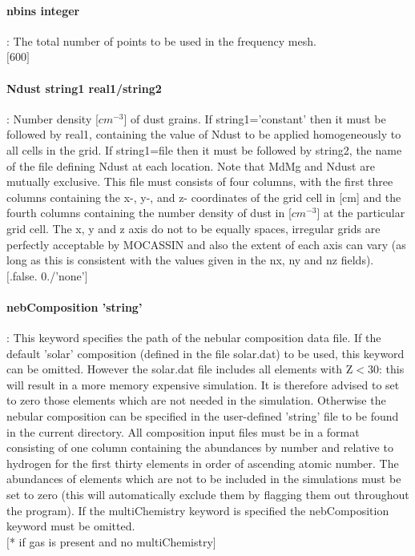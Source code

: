 \documentclass[11pt]{article}
\begin{document}
\paragraph    {nbins integer  }  : The total number of points to be used in the frequency mesh. \\
		     $[$600$]$\\

\paragraph    {Ndust string1 real1/string2 }: Number density [$cm^{-3}$] of dust grains. If 
                     string1='constant' then it must be followed by real1, containing 
                     the value of Ndust to be applied homogeneously to all cells in the 
                     grid. If string1=file then it must be followed by string2, the name of 
                     the file defining Ndust at each location. Note that MdMg and Ndust are 
		     mutually exclusive. This file must consists of four columns, with the first three 
		     columns containing the x-, y-, and z- coordinates of the grid cell in 
		     [cm] and the fourth columns containing the number density of dust
                     in [$cm^{-3}$] at the particular grid cell. The 
		     x, y and z axis do not to be equally spaces, irregular grids are 
		     perfectly acceptable by MOCASSIN and also the extent of each axis 
		     can vary (as long as this is consistent with the values given in 
		     the nx, ny and nz fields).\\
		     $[$.false. 0./'none'$]$\\

\paragraph   { nebComposition 'string'}: This keyword specifies the path of the nebular 
		     composition data file. If the default 'solar' composition 
		     (defined in the file solar.dat) to be used, this keyword can 
		     be omitted. However the solar.dat file includes all elements 
		     with Z$<$30: this will result in a more memory expensive 
		     simulation. It is therefore advised to set to zero those 
		     elements which are not needed in the simulation. Otherwise the 
		     nebular composition can be specified in the user-defined 'string' 
		     file to be found in the current directory. All composition 
		     input files must be in a format consisting of one column containing 
		     the abundances by number and relative to hydrogen for the first 
		     thirty elements in order of ascending atomic number.
		     The abundances of elements which are not to be included in 
		     the simulations must be set to zero (this will automatically
		     exclude them by flagging them out throughout the program).
		     If the multiChemistry keyword is specified the nebComposition 
		     keyword must be omitted.\\
		     $[$* if gas is present and no multiChemistry$]$\\
\end{document}
